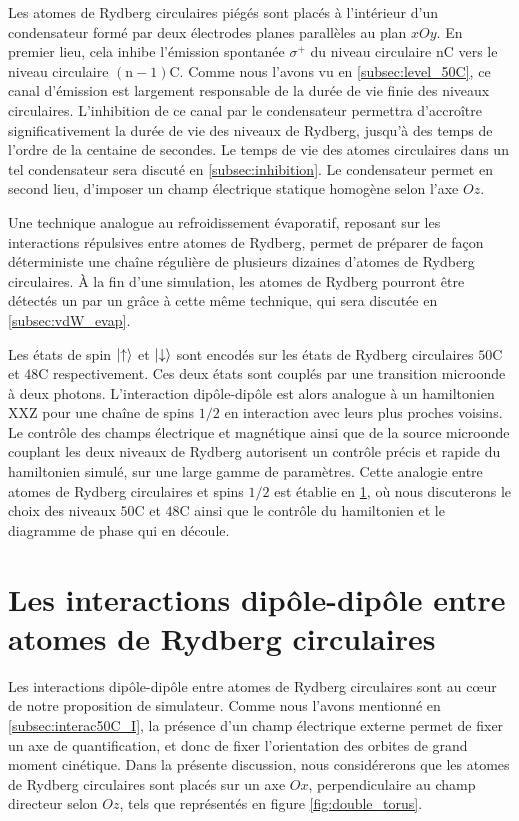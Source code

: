 Les atomes de Rydberg circulaires piégés sont placés à l'intérieur d'un condensateur formé par deux électrodes planes parallèles au plan $xOy$.
En premier lieu, cela inhibe l'émission spontanée $\sigma^+$ du niveau circulaire $\mathrm{nC}$ vers le niveau circulaire $\mathrm{(n-1)C}$.
Comme nous l'avons vu en \ref{subsec:level_50C}, ce canal d'émission est largement responsable de la durée de vie finie des niveaux circulaires.
L'inhibition de ce canal par le condensateur permettra d'accroître significativement la durée de vie des niveaux de Rydberg, jusqu'à des temps de l'ordre de la centaine de secondes.
Le temps de vie des atomes circulaires dans un tel condensateur sera discuté en \ref{subsec:inhibition}.
Le condensateur permet en second lieu, d'imposer un champ électrique statique homogène selon l'axe $Oz$.

Une technique analogue au refroidissement évaporatif, reposant sur les interactions répulsives entre atomes de Rydberg, permet de préparer de façon déterministe une chaîne régulière de plusieurs dizaines d'atomes de Rydberg circulaires.
\`A la fin d'une simulation, les atomes de Rydberg pourront être détectés un par un grâce à cette même technique, qui sera discutée en \ref{subsec:vdW_evap}.

Les états de spin $\ket{\uparrow}$ et $\ket{\downarrow}$ sont encodés sur les états de Rydberg circulaires $\mathrm{50C}$ et $\mathrm{48C}$ respectivement.
Ces deux états sont couplés par une transition microonde à deux photons.
L'interaction dipôle-dipôle est alors analogue à un hamiltonien XXZ pour une chaîne de spins $1/2$ en interaction avec leurs plus proches voisins.
Le contrôle des champs électrique et magnétique ainsi que de la source microonde couplant les deux niveaux de Rydberg autorisent un contrôle précis et rapide du hamiltonien simulé, sur une large gamme de paramètres.
Cette analogie entre atomes de Rydberg circulaires et spins $1/2$ est établie en \ref{sec:circ_interactions}, où nous discuterons le choix des niveaux $\mathrm{50C}$ et $\mathrm{48C}$ ainsi que le contrôle du hamiltonien et le diagramme de phase qui en découle.



\section{Les interactions dipôle-dipôle entre atomes de Rydberg circulaires}\label{sec:circ_interactions}
\noindent Les interactions dipôle-dipôle entre atomes de Rydberg circulaires sont au c\oe ur de notre proposition de simulateur.
Comme nous l'avons mentionné en \ref{subsec:interac50C_I}, la présence d'un champ électrique externe permet de fixer un axe de quantification, et donc de fixer l'orientation des orbites de grand moment cinétique.
Dans la présente discussion, nous considérerons que les atomes de Rydberg circulaires sont placés sur un axe $Ox$, perpendiculaire au champ directeur selon $Oz$, tels que représentés en figure \eqref{fig:double_torus}.

